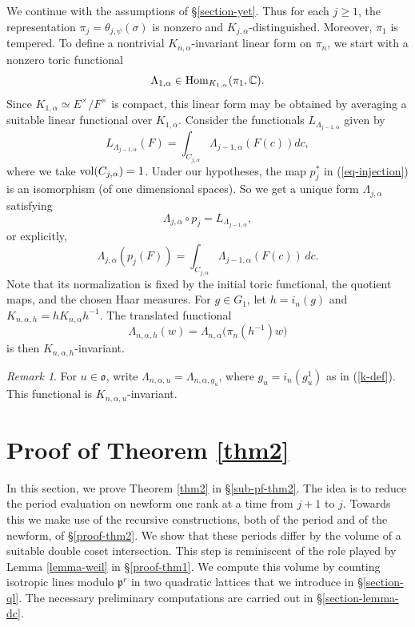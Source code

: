\documentclass[12pt]{amsart}
\theoremstyle{definition}
\theoremstyle{remark}
\newtheorem{remark}{Remark}
\begin{document}
We continue with the assumptions of \S \ref{section-yet}. Thus for each $j \geq 1$, the representation
$\pi_j=\theta_{j,\psi}(\sigma)$ is nonzero and $K_{j,\alpha}$-distinguished. Moreover, $\pi_1$ is tempered. To define a nontrivial $K_{n,\alpha}$-invariant linear form on $\pi_n$, we start with a nonzero toric functional
\[
\Lambda_{1,\alpha}\in {\rm Hom}_{K_{1,\alpha}}(\pi_1,\mathbb C).
\]
Since $K_{1,\alpha}\simeq E^\times/F^\times$ is compact, this linear form may be obtained by averaging a suitable linear functional over $K_{1,\alpha}$. 
Consider the functionals $L_{\Lambda_{j-1,\alpha}}$ given by
\[
L_{\Lambda_{j-1,\alpha}}(F)
=
\int_{C_{j,\alpha}}
\Lambda_{j-1,\alpha}(F(c))dc,
\]
where we take ${\rm vol}(C_{j,\alpha})=1$. Under our hypotheses, the map $p_j^*$ in (\ref{eq-injection}) is an isomorphism (of one dimensional spaces).
So we get a unique form $\Lambda_{j,\alpha}$ satisfying
\[
\Lambda_{j,\alpha}\circ p_j
=
L_{\Lambda_{j-1,\alpha}},
\]
or explicitly,
\begin{equation}\label{eq-recursive}
\Lambda_{j,\alpha}(p_j(F))
=
\int_{C_{j,\alpha}}
\Lambda_{j-1,\alpha}(F(c))\,dc.
\end{equation}
Note that its normalization is fixed by the initial toric functional, the quotient maps, and the chosen  Haar measures.
For $g\in G_1$, let $h=i_n(g)$ and $K_{n,\alpha,h}=hK_{n,\alpha}h^{-1}$. The translated functional
\begin{equation}\label{eq-translated}
\Lambda_{n,\alpha,h}(w)
=
\Lambda_{n,\alpha}\bigl(\pi_n(h^{-1})w\bigr)
\end{equation}
is then $K_{n,\alpha,h}$-invariant.

\begin{remark}\label{rmk-k-def}
For $u\in\mathfrak o$, write
$\Lambda_{n,\alpha,u}=\Lambda_{n,\alpha,g_u}$, where
$g_u=i_n(g_u^1)$ as in (\ref{k-def}). This functional is $K_{n,\alpha,u}$-invariant.
\end{remark}

\section{Proof of Theorem \ref{thm2}}\label{proofthm2added}

In this section, we prove Theorem \ref{thm2} in \S \ref{sub-pf-thm2}. The idea is to reduce the period evaluation on newform one rank at a time from $j+1$ to $j$. Towards this we make use of the recursive constructions, both of the period and of the newform, of \S \ref{proof-thm2}. We show that these periods differ by the volume of a suitable double coset intersection. This step is reminiscent of the role played by Lemma \ref{lemma-weil} in \S \ref{proof-thm1}. We compute this volume by counting isotropic lines modulo $\mathfrak p^r$ in two quadratic lattices that we introduce in \S \ref{section-ql}. The necessary preliminary computations are carried out in \S \ref{section-lemma-dc}. 
\end{document}
